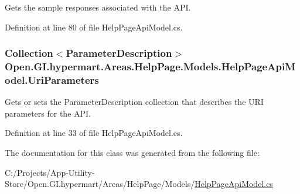 Gets the sample responses associated with the A\+P\+I. 



Definition at line 80 of file Help\+Page\+Api\+Model.\+cs.

\hypertarget{class_open_1_1_g_i_1_1hypermart_1_1_areas_1_1_help_page_1_1_models_1_1_help_page_api_model_a1ff7528f7e83c0a9951649f44f55745f}{}
\subsubsection[{Uri\+Parameters}]{\setlength{\rightskip}{0pt plus 5cm}Collection$<${\bf Parameter\+Description}$>$ Open.\+G\+I.\+hypermart.\+Areas.\+Help\+Page.\+Models.\+Help\+Page\+Api\+Model.\+Uri\+Parameters\hspace{0.3cm}{\ttfamily [get]}}\label{class_open_1_1_g_i_1_1hypermart_1_1_areas_1_1_help_page_1_1_models_1_1_help_page_api_model_a1ff7528f7e83c0a9951649f44f55745f}


Gets or sets the Parameter\+Description collection that describes the U\+R\+I parameters for the A\+P\+I. 



Definition at line 33 of file Help\+Page\+Api\+Model.\+cs.



The documentation for this class was generated from the following file\+:\begin{DoxyCompactItemize}
\item 
C\+:/\+Projects/\+App-\/\+Utility-\/\+Store/\+Open.\+G\+I.\+hypermart/\+Areas/\+Help\+Page/\+Models/\hyperlink{_help_page_api_model_8cs}{Help\+Page\+Api\+Model.\+cs}\end{DoxyCompactItemize}

